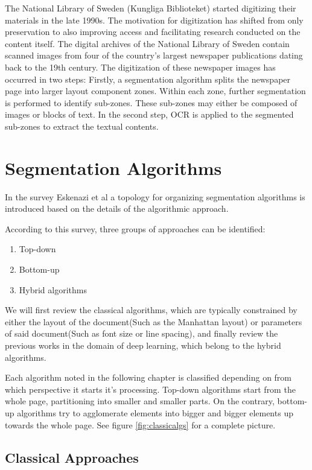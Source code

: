 \documentclass[english, bibtex]{kththesis}
\begin{document}
The National Library of Sweden (Kungliga Biblioteket) started digitizing their materials in the late 1990s. The motivation for digitization has shifted from only preservation to also improving access and facilitating research conducted on the content itself. \cite{Rekathati_2020} The digital archives of the National Library of Sweden contain scanned images from four of the country’s largest newspaper publications dating back to the 19th century. The digitization of these newspaper images has occurred in two steps: Firstly, a segmentation algorithm splits the newspaper page into larger layout component zones. Within each zone, further segmentation is performed to identify sub-zones. These sub-zones may either be composed of images or blocks of text. In the second step, OCR is applied to the segmented sub-zones to extract the textual contents. 

\section{Segmentation Algorithms}

In the survey Eskenazi et al\cite{ESKENAZI20171} a topology for organizing segmentation algorithms is introduced based on the details of the algorithmic approach. 

According to this survey, three groups of approaches can be identified: 

\begin{enumerate}
\item Top-down
\item Bottom-up
\item Hybrid algorithms
\end{enumerate}

We will first review the classical algorithms, which are typically constrained by either the layout of the document(Such as the Manhattan layout) or parameters of said document(Such as font size or line spacing), and finally review the previous works in the domain of deep learning, which belong to the hybrid algorithms.

Each algorithm noted in the following chapter is classified depending on from which perspective it starts it's processing. Top-down algorithms start from the whole page, partitioning into smaller and smaller parts. On the contrary, bottom-up algorithms try to agglomerate elements into bigger and bigger elements up towards the whole page. See figure \ref{fig:classicalgs} for a complete picture.

\subsection{Classical Approaches}
\end{document}
